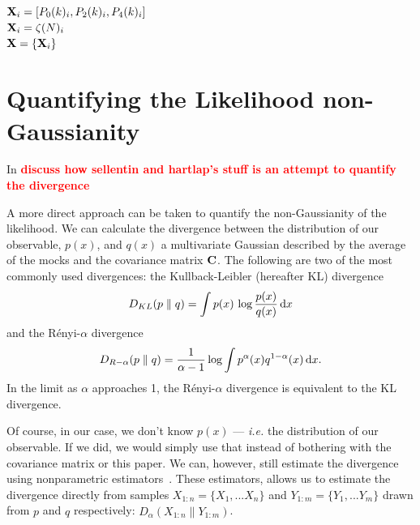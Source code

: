 \documentclass[12pt, letterpaper, preprint]{aastex}
\newcommand{\beq}{\begin{equation}}
\newcommand{\eeq}{\end{equation}}
\newcommand{\todo}[1]{{\bf \textcolor{red}{#1}}}
\begin{document}
\subsection{}
${\bf X}_i = [P_0(k)_i,P_2(k)_i,P_4(k)_i]$ \\
${\bf X}_i = \zeta(N)_i$ \\ 
${\bf X} = \{{\bf X}_i\}$


\section{Quantifying the Likelihood non-Gaussianity}
In \cite{sellentin2017} \todo{discuss how sellentin and hartlap's stuff is an attempt to quantify the divergence} 

A more direct approach can be taken to quantify the non-Gaussianity of 
the likelihood. We can calculate the divergence between the distribution 
of our observable, $p(x)$, and $q(x)$ a multivariate Gaussian described 
by the average of the mocks and the covariance matrix ${\bf C}$.
The following are two of the most commonly used divergences: 
the Kullback-Leibler (hereafter KL) divergence
\beq \label{eq:kl} 
D_{KL} ( p \parallel q ) = \int p(x)\,\log \frac{p(x)}{q(x)}\,{\rm d}x
\eeq
and the R\'enyi-$\alpha$ divergence
\beq \label{eq:renyi}
D_{R-\alpha} ( p \parallel q ) = \frac{1}{\alpha -1} \log \int p^\alpha(x) q^{1 -\alpha}(x)\,{\rm d}x. 
\eeq
In the limit as $\alpha$ approaches 1, the R\'enyi-$\alpha$ divergence is
equivalent to the KL divergence.

Of course, in our case, we don't know $p(x)$ --- \emph{i.e.} the distribution of
our observable. If we did, we would simply use that instead of bothering with 
the covariance matrix or this paper. We can, however, still estimate the 
divergence using nonparametric estimators~\citep{wang2009, poczos2012, krishnamurthy2014}. 
These estimators, allows us to estimate the divergence directly from 
samples $X_{1:n} = \{ X_1, ... X_n \}$ and $Y_{1:m} = \{ Y_1, ... Y_m \}$ 
drawn from $p$ and $q$ respectively: $\hat{D}_{\alpha}(X_{1:n} \parallel Y_{1:m})$. 
\end{document}
